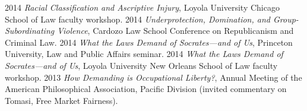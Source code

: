 \documentclass[letterpaper]{moderncv}
\begin{document}
\vspace{1mm}
\cvitem
{2014}
{\textit{Racial Classification and Ascriptive Injury}, Loyola University Chicago School of Law faculty workshop.}
\vspace{1mm}
\cvitem
{2014}
{\textit{Underprotection, Domination, and Group-Subordinating Violence}, Cardozo Law School Conference on Republicanism and Criminal Law.}
\vspace{1mm}
\cvitem
{2014}
{\textit{What the Laws Demand of Socrates---and of Us}, Princeton University, Law and Public Affairs seminar.}
\vspace{1mm}
\cvitem
{2014}
{\textit{What the Laws Demand of Socrates---and of Us}, Loyola University New Orleans School of Law faculty workshop.}
\vspace{1mm}
\cvitem
{2013}
{\textit{How Demanding is Occupational Liberty?}, Annual Meeting of the American Philosophical Association, Pacific Division (invited commentary on Tomasi, Free Market Fairness).}
\vspace{1mm}
\end{document}
